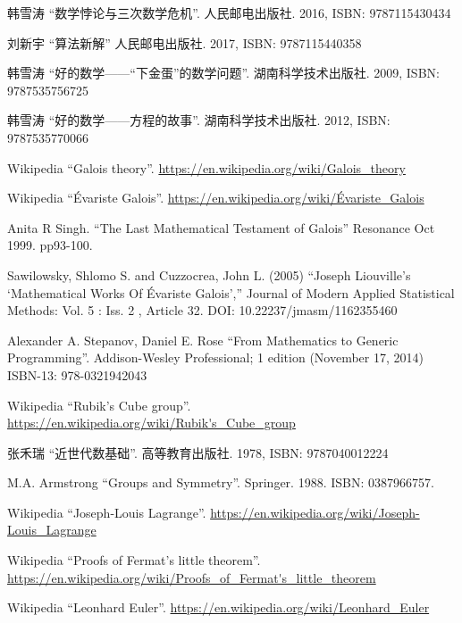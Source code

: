 \documentclass{article}
\begin{document}
\ifx\wholebook\relax \else
\begin{thebibliography}{99}

{\fontspec{\cnmainft}韩雪涛 ``数学悖论与三次数学危机''. 人民邮电出版社.} 2016, ISBN: 9787115430434

{\fontspec{\cnmainft}刘新宇 ``算法新解'' 人民邮电出版社.} 2017, ISBN: 9787115440358

{\fontspec{\cnmainft}韩雪涛 ``好的数学——“下金蛋”的数学问题''. 湖南科学技术出版社.} 2009, ISBN: 9787535756725

{\fontspec{\cnmainft}韩雪涛 ``好的数学——方程的故事''. 湖南科学技术出版社.} 2012, ISBN: 9787535770066

Wikipedia ``Galois theory''. \url{https://en.wikipedia.org/wiki/Galois_theory}

Wikipedia ``Évariste Galois''. \url{https://en.wikipedia.org/wiki/Évariste_Galois}

Anita R Singh. ``The Last Mathematical Testament of Galois'' Resonance Oct 1999. pp93-100.

Sawilowsky, Shlomo S. and Cuzzocrea, John L. (2005) ``Joseph Liouville’s `Mathematical Works Of Évariste Galois','' Journal of Modern Applied Statistical Methods: Vol. 5 : Iss. 2 , Article 32. DOI: 10.22237/jmasm/1162355460

Alexander A. Stepanov, Daniel E. Rose ``From Mathematics to Generic Programming''. Addison-Wesley Professional; 1 edition (November 17, 2014) ISBN-13: 978-0321942043

Wikipedia ``Rubik's Cube group''. \url{https://en.wikipedia.org/wiki/Rubik's_Cube_group}

{\fontspec{\cnmainft}张禾瑞 ``近世代数基础''. 高等教育出版社.} 1978, ISBN: 9787040012224

M.A. Armstrong ``Groups and Symmetry''. Springer. 1988. ISBN: 0387966757.

Wikipedia ``Joseph-Louis Lagrange''. \url{https://en.wikipedia.org/wiki/Joseph-Louis_Lagrange}

Wikipedia ``Proofs of Fermat's little theorem''. \url{https://en.wikipedia.org/wiki/Proofs_of_Fermat's_little_theorem}

Wikipedia ``Leonhard Euler''. \url{https://en.wikipedia.org/wiki/Leonhard_Euler}


\end{thebibliography}
\end{document}
